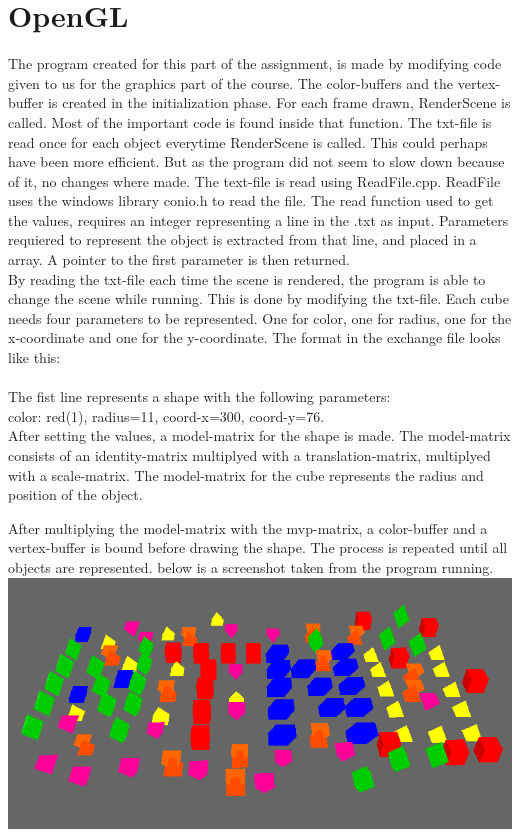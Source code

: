 \lstset{language = c}
\section{OpenGL}
The program created for this part of the assignment, 
is made by modifying code given to us for the graphics part of the course. 
The color-buffers and the vertex-buffer is created in the initialization phase. 
For each frame drawn, RenderScene is called. Most of the important code is found inside that function.
The txt-file is read once for each object everytime RenderScene is called. This could perhaps have been more efficient. But as the program did not seem to slow down because of it, no changes where made.
The text-file is read using ReadFile.cpp.
ReadFile uses the windows library conio.h to read the file. 
The read function used to get the values, requires an integer representing a line in the .txt as input.
Parameters requiered to represent the object is extracted from that line, and placed in a array.
A pointer to the first parameter is then returned.
\\
By reading the txt-file each time the scene is rendered, the program is able to change the scene while running.
This is done by modifying the txt-file. 
Each cube needs four parameters to be represented.
One for color, one for radius, one for the x-coordinate and one for the y-coordinate. The format in the exchange file looks like this:
\\

\\
The fist line represents a shape with the following parameters:
\\color: red(1), radius=11, coord-x=300, coord-y=76.
\\
After setting the values, a model-matrix for the shape is made. 
The model-matrix consists of an identity-matrix multiplyed with a translation-matrix, multiplyed with a scale-matrix. 
The model-matrix for the cube represents the radius and position of the object.
 
After multiplying the model-matrix with the mvp-matrix, a color-buffer and a vertex-buffer is bound before drawing the shape.
The process is repeated until all objects are represented. 
below is a screenshot taken from the program running.
\\
\includegraphics[scale=0.75]{Screen1.png}
